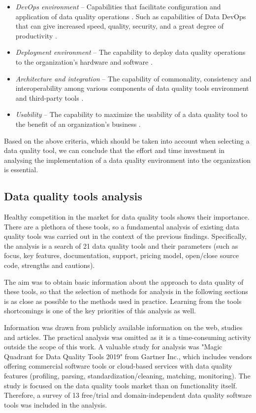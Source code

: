 \begin{itemize}
				\item \textit{DevOps environment} -- Capabilities that facilitate configuration and application of data quality operations \cite{Chien2019}. Such as capabilities of Data DevOps that can give increased speed, quality, security, and a great degree of productivity \cite{Smith2019}.
				\item \textit{Deployment environment} -- The capability to deploy data quality operations to the organization's hardware and software \cite{Chien2019}.
				\item \textit{Architecture and integration} -- The capability of commonality, consistency and interoperability among various components of data quality tools environment and third-party tools \cite{Chien2019}.
				\item \textit{Usability} -- The capability to maximize the usability of a data quality tool to the benefit of an organization's business \cite{Chien2019}.
			\end{itemize}			    	
    	
			Based on the above criteria, which should be taken into account when selecting a data quality tool, we can conclude that the effort and time investment in analysing the implementation of a data quality environment into the organization is essential.    	
    	
		\subsection{Data quality tools analysis}    	
    	
    		Healthy competition in the market for data quality tools shows their importance. There are a plethora of these tools, so a fundamental analysis of existing data quality tools  was carried out in the context of the previous findings. Specifically, the analysis is a search of 21 data quality tools and their parameters (such as focus, key features, documentation, support, pricing model, open/close source code, strengths and cautions).
    		
      		The aim was to obtain basic information about the approach to data quality of these tools, so that the selection of methods for analysis in the following sections is as close as possible to the methods used in practice. Learning from the tools shortcomings is one of the key priorities of this analysis as well.
      
      		Information was drawn from publicly available information on the web, studies and articles. The practical analysis was omitted as it is a time-consuming activity outside the scope of this work. A valuable study for analysis was "Magic Quadrant for Data Quality Tools 2019" \cite{Chien2019} from Gartner Inc., which includes vendors offering commercial software tools or cloud-based services with data quality features (profiling, parsing, standardization/cleaning, matching, monitoring). The study is focused on the data quality tools market than on functionality itself. Therefore, a survey \cite{Ehrlinger2019} of 13 free/trial and domain-independent data quality software tools was included in the analysis.
      		
